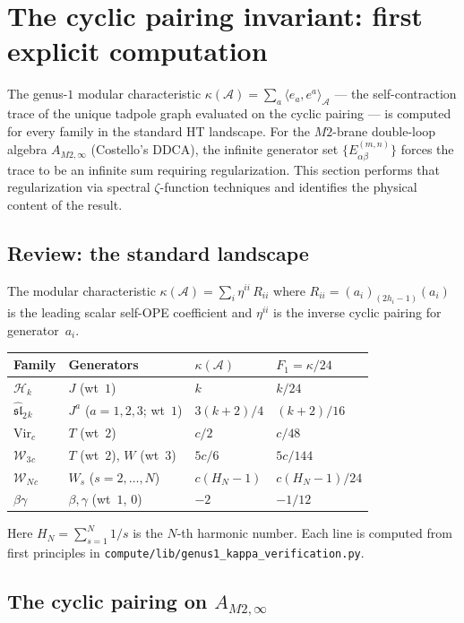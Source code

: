\documentclass[11pt]{article}
\newcommand{\cA}{\mathcal{A}}
\newcommand{\cW}{\mathcal{W}}
\newcommand{\cH}{\mathcal{H}}
\newcommand{\fsl}{\mathfrak{sl}}
\begin{document}
\section{The cyclic pairing invariant: first explicit computation}
\label{sec:cyclic-pairing-invariant}

The genus-$1$ modular characteristic
$\kappa(\cA) = \sum_a \langle e_a, e^a \rangle_\cA$
--- the self-contraction trace of the unique tadpole graph
evaluated on the cyclic pairing --- is computed for every family
in the standard HT landscape.
For the $M2$-brane double-loop algebra $A_{M2,\infty}$
(Costello's DDCA), the infinite generator set
$\{E^{(m,n)}_{\alpha\beta}\}$ forces the trace to be an infinite
sum requiring regularization.  This section performs that
regularization via spectral $\zeta$-function techniques and
identifies the physical content of the result.

\subsection{Review: the standard landscape}

The modular characteristic
$\kappa(\cA) = \sum_i \eta^{ii}\, R_{ii}$
where $R_{ii} = (a_i)_{(2h_i-1)}(a_i)$ is the leading scalar
self-OPE coefficient and $\eta^{ii}$ is the inverse cyclic
pairing for generator~$a_i$.

\begin{center}
\renewcommand{\arraystretch}{1.3}
\begin{tabular}{llll}
\textbf{Family} & \textbf{Generators} & $\kappa(\cA)$ & \textbf{$F_1 = \kappa/24$} \\
\hline
$\cH_k$ & $J$ (wt~$1$) & $k$ & $k/24$ \\
$\widehat{\fsl}_2{}_k$ & $J^a$ ($a=1,2,3$; wt~$1$) & $3(k+2)/4$ & $(k+2)/16$ \\
$\mathrm{Vir}_c$ & $T$ (wt~$2$) & $c/2$ & $c/48$ \\
$\cW_3{}_c$ & $T$ (wt~$2$), $W$ (wt~$3$) & $5c/6$ & $5c/144$ \\
$\cW_N{}_c$ & $W_s$ ($s=2,\ldots,N$) & $c(H_N - 1)$ & $c(H_N-1)/24$ \\
$\beta\gamma$ & $\beta,\gamma$ (wt~$1$, $0$) & $-2$ & $-1/12$
\end{tabular}
\end{center}
Here $H_N = \sum_{s=1}^N 1/s$ is the $N$-th harmonic number.
Each line is computed from first principles in
\texttt{compute/lib/genus1\_kappa\_verification.py}.

\subsection{The cyclic pairing on $A_{M2,\infty}$}
\end{document}
